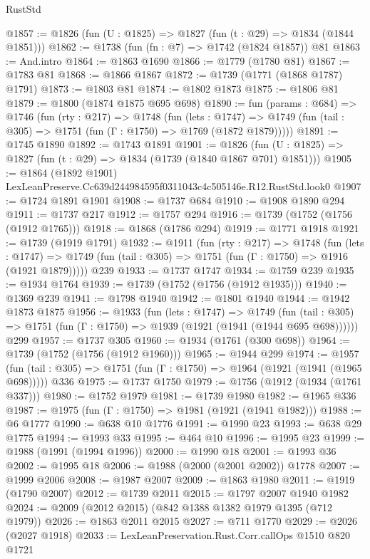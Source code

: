 \begin{lexlean}{RustStd}
\begin{coremodule}
@1857 := @1826 (fun (U : @1825) => @1827 (fun (t : @29) => @1834 (@1844 @1851)))
@1862 := @1738 (fun (fn : @7) => @1742 (@1824 @1857)) @81
@1863 := And.intro
@1864 := @1863 @1690
@1866 := @1779 (@1780 @81)
@1867 := @1783 @81
@1868 := @1866 @1867
@1872 := @1739 (@1771 (@1868 @1787) @1791)
@1873 := @1803 @81
@1874 := @1802 @1873
@1875 := @1806 @81
@1879 := @1800 (@1874 @1875 @695 @698)
@1890 := fun (params : @684) =>
  @1746
    (fun (rty : @217) =>
    @1748
      (fun (lets : @1747) =>
      @1749 (fun (tail : @305) => @1751 (fun (Γ : @1750) => @1769 (@1872 @1879)))))
@1891 := @1745 @1890
@1892 := @1743 @1891
@1901 := @1826 (fun (U : @1825) => @1827 (fun (t : @29) => @1834 (@1739 (@1840 @1867 @701) @1851)))
@1905 := @1864 (@1892 @1901) LexLeanPreserve.Cc639d244984595f0311043c4c505146e.R12.RustStd.look0
@1907 := @1724 @1891 @1901
@1908 := @1737 @684
@1910 := @1908 @1890 @294
@1911 := @1737 @217
@1912 := @1757 @294
@1916 := @1739 (@1752 (@1756 (@1912 @1765)))
@1918 := @1868 (@1786 @294)
@1919 := @1771 @1918
@1921 := @1739 (@1919 @1791)
@1932 := @1911
    (fun (rty : @217) =>
    @1748
      (fun (lets : @1747) =>
      @1749 (fun (tail : @305) => @1751 (fun (Γ : @1750) => @1916 (@1921 @1879)))))
    @239
@1933 := @1737 @1747
@1934 := @1759 @239
@1935 := @1934 @1764
@1939 := @1739 (@1752 (@1756 (@1912 @1935)))
@1940 := @1369 @239
@1941 := @1798 @1940
@1942 := @1801 @1940
@1944 := @1942 @1873 @1875
@1956 := @1933
    (fun (lets : @1747) =>
    @1749 (fun (tail : @305) => @1751 (fun (Γ : @1750) => @1939 (@1921 (@1941 (@1944 @695 @698))))))
    @299
@1957 := @1737 @305
@1960 := @1934 (@1761 (@300 @698))
@1964 := @1739 (@1752 (@1756 (@1912 @1960)))
@1965 := @1944 @299
@1974 := @1957
    (fun (tail : @305) => @1751 (fun (Γ : @1750) => @1964 (@1921 (@1941 (@1965 @698)))))
    @336
@1975 := @1737 @1750
@1979 := @1756 (@1912 (@1934 (@1761 @337)))
@1980 := @1752 @1979
@1981 := @1739 @1980
@1982 := @1965 @336
@1987 := @1975 (fun (Γ : @1750) => @1981 (@1921 (@1941 @1982)))
@1988 := @6 @1777
@1990 := @638 @10 @1776
@1991 := @1990 @23
@1993 := @638 @29 @1775
@1994 := @1993 @33
@1995 := @464 @10
@1996 := @1995 @23
@1999 := @1988 (@1991 (@1994 @1996))
@2000 := @1990 @18
@2001 := @1993 @36
@2002 := @1995 @18
@2006 := @1988 (@2000 (@2001 @2002)) @1778
@2007 := @1999 @2006
@2008 := @1987 @2007
@2009 := @1863 @1980
@2011 := @1919 (@1790 @2007)
@2012 := @1739 @2011
@2015 := @1797 @2007 @1940 @1982
@2024 := @2009 (@2012 @2015) (@842 @1388 @1382 @1979 @1395 (@712 @1979))
@2026 := @1863 @2011 @2015
@2027 := @711 @1770
@2029 := @2026 (@2027 @1918)
@2033 := LexLeanPreservation.Rust.Corr.callOps @1510 @820 @1721

\end{coremodule}
\end{lexlean}

